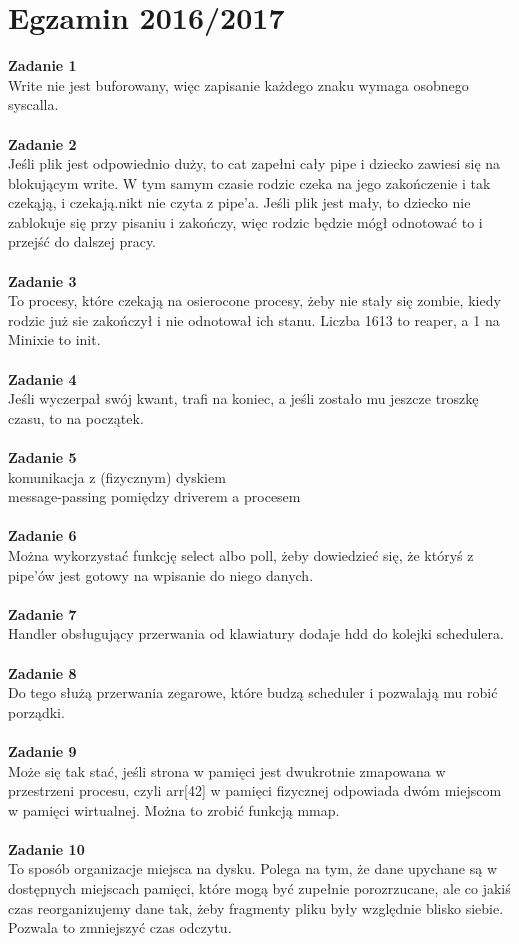 \documentclass[12pt, a4paper, polish, openany]{book}
\begin{document}
\section{Egzamin 2016/2017}
\textbf{Zadanie 1} \\
Write nie jest buforowany, więc zapisanie każdego znaku wymaga osobnego syscalla. \\\\
\textbf{Zadanie 2} \\
Jeśli plik jest odpowiednio duży, to cat zapełni cały pipe i dziecko zawiesi się na blokującym write. W tym samym czasie rodzic czeka na jego zakończenie i tak czekąją, i czekają.nikt nie czyta z pipe'a. Jeśli plik jest mały, to dziecko nie zablokuje się przy pisaniu i zakończy, więc rodzic będzie mógł odnotować to i przejść do dalszej pracy. \\\\
\textbf{Zadanie 3} \\
To procesy, które czekają na osierocone procesy, żeby nie stały się zombie, kiedy rodzic  już sie zakończył i nie odnotował ich stanu. Liczba 1613 to reaper, a 1 na Minixie to init. \\\\
\textbf{Zadanie 4} \\
Jeśli wyczerpał swój kwant, trafi na koniec, a jeśli zostało mu jeszcze troszkę czasu, to na początek. \\\\
\textbf{Zadanie 5} \\
komunikacja z (fizycznym) dyskiem \\
message-passing pomiędzy driverem a procesem \\\\
\textbf{Zadanie 6} \\
Można wykorzystać funkcję select albo poll, żeby dowiedzieć się, że któryś z pipe’ów jest gotowy na wpisanie do niego danych. \\\\
\textbf{Zadanie 7} \\
Handler obsługujący przerwania od klawiatury dodaje hdd do kolejki schedulera. \\\\
\textbf{Zadanie 8} \\
Do tego służą przerwania zegarowe, które budzą scheduler i pozwalają mu robić porządki. \\\\
\textbf{Zadanie 9} \\
Może się tak stać, jeśli strona w pamięci jest dwukrotnie zmapowana w przestrzeni procesu, czyli arr[42] w pamięci fizycznej odpowiada dwóm miejscom w pamięci wirtualnej. Można to zrobić funkcją mmap. \\\\
\textbf{Zadanie 10} \\
To sposób organizacje miejsca na dysku. Polega na tym, że dane upychane są w dostępnych miejscach pamięci, które mogą być zupełnie porozrzucane, ale co jakiś czas reorganizujemy dane tak, żeby fragmenty pliku były względnie blisko siebie. Pozwala to zmniejszyć czas odczytu. \\\\
\end{document}
